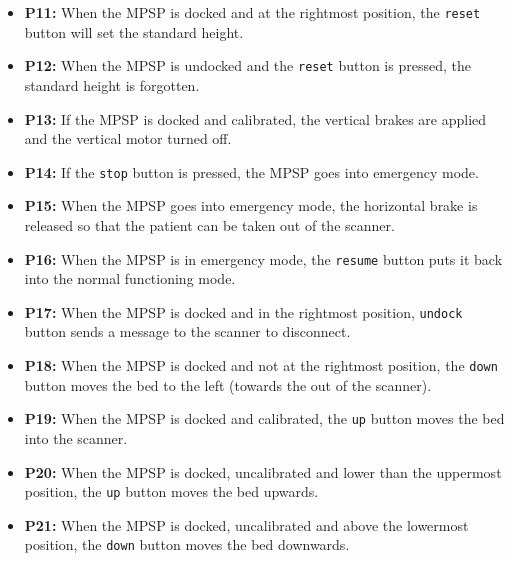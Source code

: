 \begin{itemize}
    \item \textbf{P11:}  When the MPSP is docked and at the rightmost position, the \verb$reset$ button will set the standard height. \\
    \item \textbf{P12:} When the MPSP is undocked and the \verb$reset$ button is pressed, the standard height is forgotten.\\
    \item \textbf{P13:} If the MPSP is docked and calibrated, the vertical brakes are applied and the vertical motor turned off. \\
    \item \textbf{P14:} If the \verb$stop$ button is pressed, the MPSP goes into emergency mode. \\
    \item \textbf{P15:} When the MPSP goes into emergency mode, the horizontal brake is released so that the patient can be taken out of the scanner. \\
    \item \textbf{P16:} When the MPSP is in emergency mode, the \verb$resume$ button puts it back into the normal functioning mode.  \\
    \item \textbf{P17:} When the MPSP is docked and in the rightmost position, \verb$undock$ button sends a message to the scanner to disconnect.\\
    \item \textbf{P18:}  When the MPSP is docked and not at the rightmost position, the \verb$down$ button moves the bed to the left (towards the out of the scanner). \\
    \item \textbf{P19:} When the MPSP is docked and calibrated, the \verb $up$ button moves the bed into the scanner. \\
    \item \textbf{P20:} When the MPSP is docked, uncalibrated and lower than the uppermost position, the \verb$up$ button moves the bed upwards. \\
    \item \textbf{P21:} When the MPSP is docked, uncalibrated and above the lowermost position, the \verb$down$ button moves the bed downwards. \\

     
\end{itemize}
